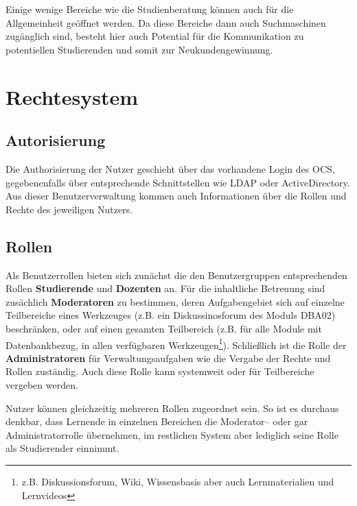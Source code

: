 Einige wenige Bereiche wie die Studienberatung können auch für die Allgemeinheit geöffnet werden. Da diese Bereiche dann auch Suchmaschinen zugänglich sind, besteht hier auch Potential für die Kommunikation zu potentiellen Studierenden und somit zur Neukundengewinnung.

\newpage
\section{Rechtesystem} %
\label{sec:rechtesystem}

\subsection{Autorisierung} %
\label{sub:authorisierung}
Die Authorisierung der Nutzer geschieht über das vorhandene Login des \ac{OCS}, gegebenenfalls über entsprechende Schnittstellen wie \ac{LDAP} oder ActiveDirectory. Aus dieser Benutzerverwaltung kommen auch Informationen über die Rollen und Rechte des jeweiligen Nutzers. 

\subsection{Rollen} %
\label{sub:rollen}
Als Benutzerrollen bieten sich zunächst die den Benutzergruppen entsprechenden Rollen \textbf{Studierende} und \textbf{Dozenten} an. Für die inhaltliche Betreuung sind zusächlich \textbf{Moderatoren} zu bestimmen, deren Aufgabengebiet sich auf einzelne Teilbereiche eines Werkzeuges (z.B. ein Diskussinosforum des Moduls DBA02) beschränken, oder auf einen gesamten Teilbereich (z.B. für alle Module mit Datenbankbezug, in allen verfügbaren Werkzeugen\footnote{z.B. Diskussionsforum, Wiki, Wissensbasis aber auch Lernmaterialien und Lernvideos}). Schließlich ist die Rolle der \textbf{Administratoren} für Verwaltungsaufgaben wie die Vergabe der Rechte und Rollen zuständig. Auch diese Rolle kann systemweit oder für Teilbereiche vergeben werden. 

Nutzer können gleichzeitig mehreren Rollen zugeordnet sein. So ist es durchaus denkbar, dass Lernende in einzelnen Bereichen die Moderator– oder gar Administratorrolle übernehmen, im restlichen System aber lediglich seine Rolle als Studierender einnimmt.

